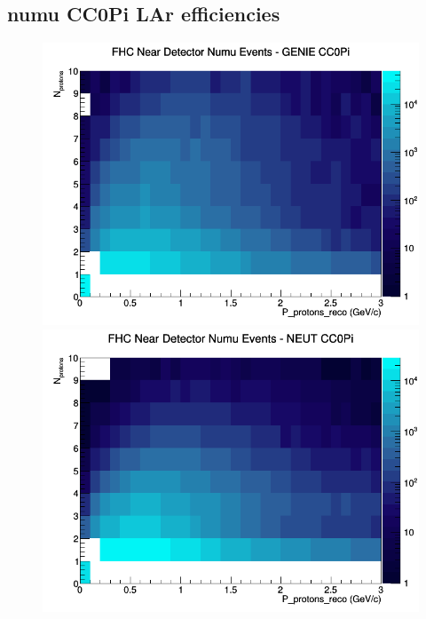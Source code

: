 \documentclass[12pt]{article}
\begin{document}
\subsection{numu CC0Pi LAr efficiencies}
\begin{figure}[h]
\includegraphics[width=\linewidth]{eff_N_P/LAr/protons/CC0Pi_FHC_ND_numu_N_P_GENIE.png}
\endminipage
{}
\includegraphics[width=\linewidth]{eff_N_P/LAr/protons/CC0Pi_FHC_ND_numu_N_P_NEUT.png}
\endminipage
{}

\end{figure}
\end{document}
